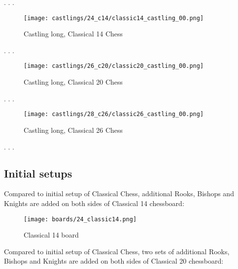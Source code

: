 . . .

\noindent
\begin{figure}[!h]
\texttt{[image: castlings/24\_c14/classic14\_castling\_00.png]}
\vspace*{-1.4\baselineskip}
\caption{Castling long, Classical 14 Chess}
\label{fig:classic14_castling_00}
\end{figure}

. . .

\noindent
\begin{figure}[!h]
\texttt{[image: castlings/26\_c20/classic20\_castling\_00.png]}
\vspace*{-1.4\baselineskip}
\caption{Castling long, Classical 20 Chess}
\label{fig:classic20_castling_00}
\end{figure}

. . .

\noindent
\begin{figure}[!h]
\texttt{[image: castlings/28\_c26/classic26\_castling\_00.png]}
\vspace*{-1.4\baselineskip}
\caption{Castling long, Classical 26 Chess}
\label{fig:classic26_castling_00}
\end{figure}

. . .

\clearpage %

\subsection*{Initial setups}
\label{sec:Simple variants/Classical Chess variants/Initial setups}

Compared to initial setup of Classical Chess, additional Rooks, Bishops and Knights
are added on both sides of Classical 14 chessboard:

\noindent
\begin{figure}[h]
\texttt{[image: boards/24\_classic14.png]}
\caption{Classical 14 board}
\label{fig:24_classic14}
\end{figure}

\vfill{}

\clearpage %

Compared to initial setup of Classical Chess, two sets of additional Rooks, Bishops
and Knights are added on both sides of Classical 20 chessboard:

